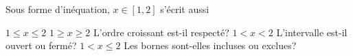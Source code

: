 \documentclass[language=french]{webquiz}
\begin{document}
\begin{question}
  Sous forme d’inéquation, $x\in[1,2]$ s’écrit aussi
  \begin{choice}
    \correct $1\le x\le 2$
    \incorrect $1\ge x\ge 2$
      \response L’ordre croissant est-il respecté?
    \incorrect $1<x<2$
      \response L’intervalle est-il ouvert ou fermé?
    \incorrect $1<x\le 2$
      \response Les bornes sont-elles incluses ou exclues?
  \end{choice}
\end{question}
\end{document}
